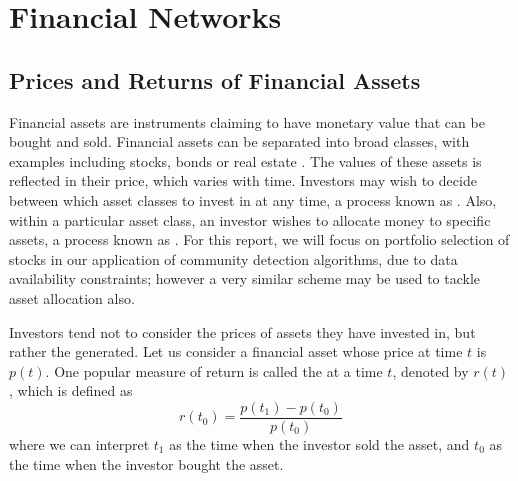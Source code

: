 \section{Financial Networks}
\label{sec:financialNetworksBackground}


\subsection{Prices and Returns of Financial Assets}
\label{subsec:financialAssetsBackground}

Financial assets are instruments claiming to have monetary value that can be bought and sold. Financial assets can be separated into broad classes, with examples including stocks, bonds or real estate \cite{Kuh12d,BKM13}.
The values of these assets is reflected in their price, which varies with time. Investors may wish to decide between which asset classes to invest in at any time, a process known as  \cite{BKM13}.
Also, within a particular asset class, an investor wishes to allocate money to specific assets, a process known as  \cite{BKM13}.
For this report, we will focus on portfolio selection of stocks in our application of community detection algorithms, due to data availability constraints; however a very similar scheme may be used to tackle asset allocation also.

Investors tend not to consider the prices of assets they have invested in, but rather the  generated. Let us consider a financial asset whose price at time $t$ is $p(t)$. One popular measure of return is called the  \cite{Kuh12e,BKM13} at a time $t$, denoted by $r(t)$, which is defined as
\begin{equation}
	\label{eq:rateOfReturn}
	r(t_{0}) = \frac{p(t_{1}) - p(t_{0})}{p(t_{0})}
\end{equation}
where we can interpret $t_{1}$ as the time when the investor sold the asset, and $t_{0}$ as the time when the investor bought the asset.

